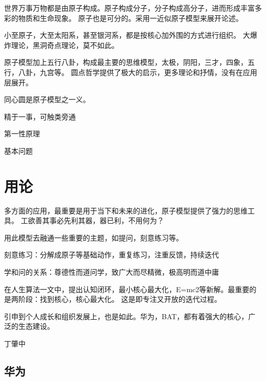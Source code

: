 世界万事万物都是由原子构成。原子构成分子，分子构成高分子，进而形成丰富多彩的物质和生命现象。
原子也是可分的。采用一近似原子模型来展开论述。

小至原子，大至太阳系，甚至银河系，都是按核心加外围的方式进行组织。
大爆炸理论，黑洞奇点理论，莫不如此。

原子模型加上五行八卦，构成最主要的思维模型，太极，阴阳，三才，四象，五行，八卦，九宫等。
圆点哲学提供了极大的启示，更多理论和抒情，没有在应用层展开。

同心圆是原子模型之一义。

精于一事，可触类旁通

第一性原理

基本问题

\section{用论}

多方面的应用，最重要是用于当下和未来的进化，原子模型提供了强力的思维工具。
工欲善其事必先利其器，器已利，不用何为？

用此模型去融通一些重要的主题，如提问，刻意练习等。

刻意练习：分解成原子等基础动作，重复练习，注重反馈，持续迭代

学和问的关系：尊德性而道问学，致广大而尽精微，极高明而道中庸

在人生算法一文中，提出认知闭环，最小核心最大化，E=mc2等新解。最重要的是两阶段：找到核心，核心最大化。
这是即专注又开放的迭代过程。

引申到个人成长和组织发展上，也是如此。华为，BAT，都有着强大的核心，广泛的生态建设。

丁肇中

\subsection{华为}
